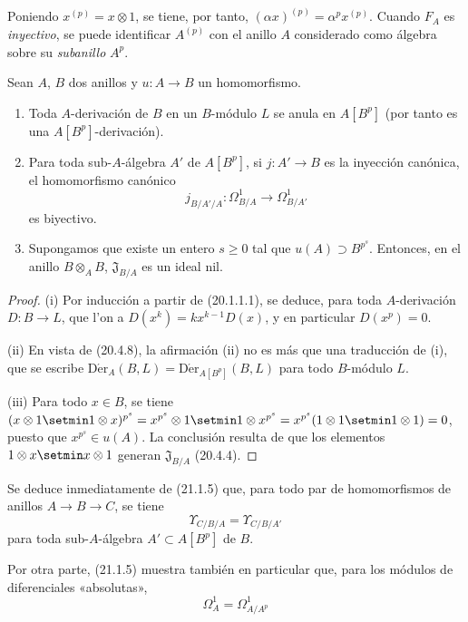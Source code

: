 Poniendo $x^{(p)}=x\otimes1$, se tiene, por tanto,
$(\alpha x)^{(p)}=\alpha^p x^{(p)}$. Cuando $F_A$ es \emph{inyectivo}, se puede
identificar $A^{(p)}$ con el anillo $A$ considerado como álgebra sobre su
\emph{subanillo} $A^p$.

\begin{proposition}[21.1.5]
\label{0.21.1.5-fr}
Sean $A$, $B$ dos anillos y $u:A\to B$ un homomorfismo.
\begin{enumerate}
  \item[\textup{(i)}] Toda $A$-derivación de $B$ en un $B$-módulo $L$ se anula en
  $A[B^p]$ (por tanto es una $A[B^p]$-derivación).
  \item[\textup{(ii)}] Para toda sub-$A$-álgebra $A'$ de $A[B^p]$, si
  $j:A'\to B$ es la inyección canónica, el homomorfismo canónico
  \[
  j_{B/A'/A}:\Omega^1_{B/A}\longrightarrow\Omega^1_{B/A'}
  \]
  es biyectivo.
  \item[\textup{(iii)}] Supongamos que existe un entero $s\geq0$ tal que
  $u(A)\supset B^{p^s}$. Entonces, en el anillo $B\otimes_A B$,
  $\mathfrak J_{B/A}$ es un ideal nil.
\end{enumerate}
\end{proposition}

\begin{proof}
(i) Por inducción a partir de (20.1.1.1), se deduce, para toda
$A$-derivación $D:B\to L$, que l'on a $D(x^k)=kx^{k-1}D(x)$, y en particular
$D(x^p)=0$.

(ii) En vista de (20.4.8), la afirmación (ii) no es más que una traducción
de (i), que se escribe
$\operatorname{D\acute{e}r}_A(B,L)=\operatorname{D\acute{e}r}_{A[B^p]}(B,L)$ para todo
$B$-módulo $L$.

(iii) Para todo $x\in B$, se tiene
$(x\otimes1\setmin1\otimes x)^{p^s}=x^{p^s}\otimes1\setmin1\otimes x^{p^s}=x^{p^s}(1\otimes1\setmin1\otimes1)=0$,
puesto que $x^{p^s}\in u(A)$. La conclusión resulta de que los elementos
$1\otimes x\setmin x\otimes1$ generan $\mathfrak J_{B/A}$ (20.4.4).
\end{proof}

Se deduce inmediatamente de (21.1.5) que, para todo par de homomorfismos de
anillos $A\to B\to C$, se tiene
\begin{equation}
\tag{21.1.5.1}
\label{0.21.1.5.1-fr}
\Upsilon_{C/B/A}=\Upsilon_{C/B/A'}
\end{equation}
para toda sub-$A$-álgebra $A'\subset A[B^p]$ de $B$.

Por otra parte, (21.1.5) muestra también en particular que, para los módulos de
diferenciales «absolutas»,
\begin{equation}
\tag{21.1.5.2}
\label{0.21.1.5.2-fr}
\Omega^1_A=\Omega^1_{A/A^p}
\end{equation}

